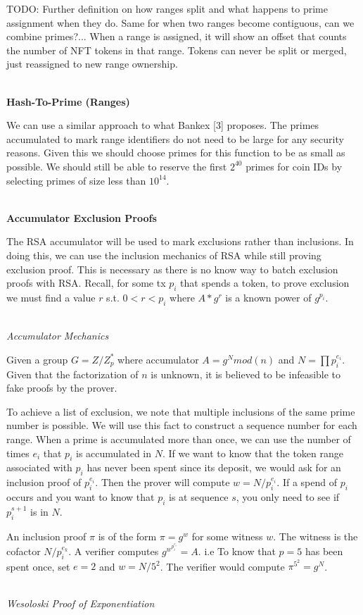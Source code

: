 \documentclass[12pt]{article}
\begin{document}
TODO: Further definition on how ranges split and what happens to prime assignment when they do. Same for when two ranges become contiguous, can we combine primes?... When a range is assigned, it will show an offset that counts the number of NFT tokens in that range. Tokens can never be split or merged, just reassigned to new range ownership.
\\
\\
\centerline{\textbf{Hash-To-Prime (Ranges)}}

We can use a similar approach to what Bankex [3] proposes. The primes accumulated to mark range identifiers do not need to be large for any security reasons. Given this we should choose primes for this function to be as small as possible. We should still be able to reserve the first $2^{40}$ primes for coin IDs by selecting primes of size less than $10^{14}$.
\\
\\
\centerline{\textbf{Accumulator Exclusion Proofs}}

The RSA accumulator will be used to mark exclusions rather than inclusions. In doing this, we can use the inclusion mechanics of RSA while still proving exclusion proof. This is necessary as there is no know way to batch exclusion proofs with RSA. Recall, for some tx $p_i$ that spends a token, to prove exclusion we must find a value $r$ s.t. $0 < r < p_i$ where $A * g^r$ is a known power of $g^{p_i}$.
\\
\\
\centerline{\textit{Accumulator Mechanics}}

Given a group $G = Z / Z_p^*$ where accumulator $A = g^N mod(n)$ and $N=\prod{p_i^{e_i}}$. Given that the factorization of $n$ is unknown, it is believed to be infeasible to fake proofs by the prover.

To achieve a list of exclusion, we note that multiple inclusions of the same prime number is possible. We will use this fact to construct a sequence number for each range. When a prime is accumulated more than once, we can use the number of times $e_i$ that $p_i$ is accumulated in $N$. If we want to know that the token range associated with $p_i$ has never been spent since its deposit, we would ask for an inclusion proof of $p_i^{e_i}$. Then the prover will compute $w = N/p_i^{e_i}$. If a spend of $p_i$ occurs and you want to know that $p_i$ is at sequence $s$, you only need to see if $p_i^{s+1}$ is in $N$. 

An inclusion proof $\pi$ is of the form $\pi = g^w$ for some witness $w$. The witness is the cofactor $N/p_i^{e_k}$. A verifier computes $g^{w^{p_i^{e_i}}} = A$. i.e To know that $p = 5$ has been spent once, set $e = 2$ and $w = N/5^2$. The verifier would compute $\pi^{5^2}= g^N$.
\\
\\
\centerline{\textit{Wesoloski Proof of Exponentiation}}
\end{document}

